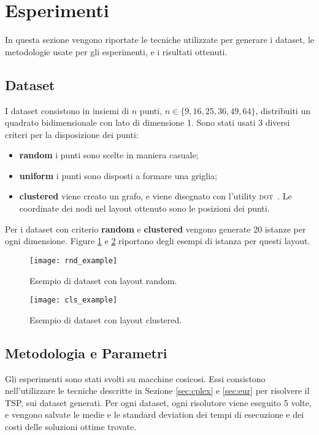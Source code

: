 \documentclass[
12pt, %
a4paper, %
oneside, %
headinclude,footinclude, %
BCOR5mm, %
]{scrartcl}
\begin{document}
\section{Esperimenti}\label{sec:exp}
In questa sezione vengono riportate le tecniche utilizzate per generare i dataset, le metodologie usate per gli esperimenti, e i risultati ottenuti.

\subsection{Dataset}
I dataset consistono in insiemi di $n$ punti, $n \in \{9, 16, 25, 36, 49, 64\}$, distribuiti un quadrato bidimensionale con lato di dimensione 1. Sono stati usati 3 diversi criteri per la disposizione dei punti:
\begin{itemize}
	\item \textbf{random} i punti sono scelte in maniera casuale;
	\item \textbf{uniform} i punti sono disposti a formare una griglia;
	\item \textbf{clustered} viene creato un grafo, e viene disegnato con l'utility \textsc{dot}~\cite{gansner2006drawing}. Le coordinate dei nodi nel layout ottenuto sono le posizioni dei punti.
\end{itemize}
Per i dataset con criterio \textbf{random} e \textbf{clustered} vengono generate 20 istanze per ogni dimensione. Figure \ref{fig:rnd} e \ref{fig:cls} riportano degli esempi di istanza per questi layout. 

\begin{figure}[H]
	\centering
	\texttt{[image: rnd\_example]}
	\caption[random]{Esempio di dataset con layout random.}
	\label{fig:rnd}
\end{figure}

\begin{figure}[H]
	\centering
	\texttt{[image: cls\_example]}
	\caption[clustered]{Esempio di dataset con layout clustered.}
	\label{fig:cls}
\end{figure}

\subsection{Metodologia e Parametri}

Gli esperimenti sono stati svolti su macchine cosicosi. Essi consistono nell'utilizzare le tecniche descritte in Sezione \ref{sec:cplex} e \ref{sec:eur} per risolvere il TSP, sui dataset generati. Per ogni dataset, ogni risolutore viene eseguito 5 volte, e vengono salvate le medie e le standard deviation dei tempi di esecuzione e dei costi delle soluzioni ottime trovate. 
\end{document}
